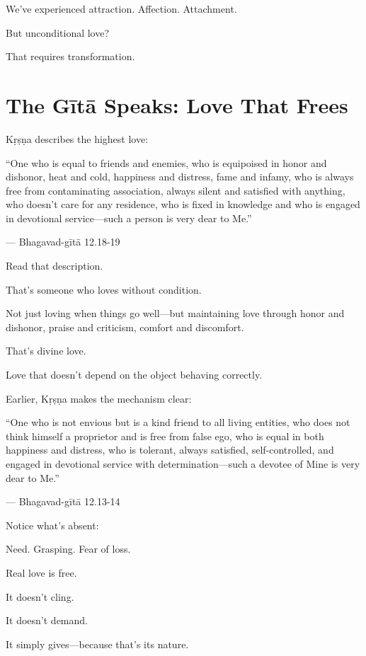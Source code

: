 \documentclass[11pt,twoside]{book}
\begin{document}
We've experienced attraction. Affection. Attachment.

But unconditional love?

That requires transformation.

\section*{The Gītā Speaks: Love That Frees}

Kṛṣṇa describes the highest love:

\begin{pullquote}
``One who is equal to friends and enemies, who is equipoised in honor and dishonor, heat and cold, happiness and distress, fame and infamy, who is always free from contaminating association, always silent and satisfied with anything, who doesn't care for any residence, who is fixed in knowledge and who is engaged in devotional service—such a person is very dear to Me.''

--- Bhagavad-gītā 12.18-19
\end{pullquote}

Read that description.

That's someone who loves without condition.

Not just loving when things go well—but maintaining love through honor and dishonor, praise and criticism, comfort and discomfort.

That's divine love.

Love that doesn't depend on the object behaving correctly.

Earlier, Kṛṣṇa makes the mechanism clear:

\begin{pullquote}
``One who is not envious but is a kind friend to all living entities, who does not think himself a proprietor and is free from false ego, who is equal in both happiness and distress, who is tolerant, always satisfied, self-controlled, and engaged in devotional service with determination—such a devotee of Mine is very dear to Me.''

--- Bhagavad-gītā 12.13-14
\end{pullquote}

Notice what's absent:

Need. Grasping. Fear of loss.

Real love is free.

It doesn't cling.

It doesn't demand.

It simply gives—because that's its nature.
\end{document}
